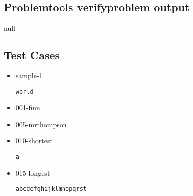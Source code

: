 \documentclass{article}%
\begin{document}
\subsection{Problemtools verifyproblem output}%
\label{subsec:Problemtoolsverifyproblemoutput}%
null

%
\subsection{Test Cases}%
\label{subsec:TestCases}%
\begin{itemize}%
\item%
sample{-}1%
\begin{lstlisting}[basicstyle=\footnotesize,backgroundcolor=\color{lightgray},framexleftmargin=1em,framexrightmargin=1em]
world

\end{lstlisting}%
\item%
001{-}finn%
%
\item%
005{-}mrthompson%
%
\item%
010{-}shortest%
\begin{lstlisting}[basicstyle=\footnotesize,backgroundcolor=\color{lightgray},framexleftmargin=1em,framexrightmargin=1em]
a

\end{lstlisting}%
\item%
015{-}longest%
\begin{lstlisting}[basicstyle=\footnotesize,backgroundcolor=\color{lightgray},framexleftmargin=1em,framexrightmargin=1em]
abcdefghijklmnopqrst

\end{lstlisting}%
\end{itemize}

%
\end{document}
